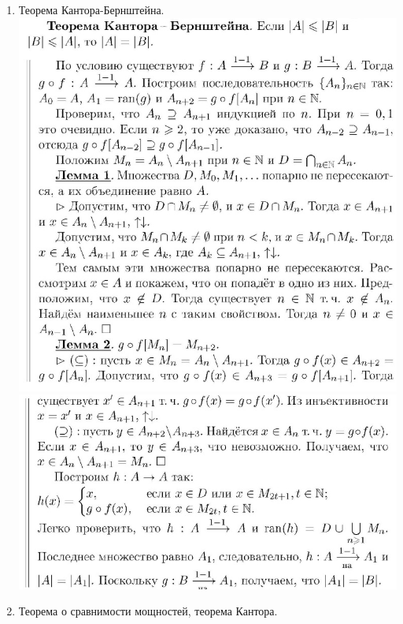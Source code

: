 \documentclass[a4paper]{article}
\theoremstyle{definition}
\begin{document}
\begin{enumerate}
 \item Теорема Кантора-Бернштейна.
       \mbox{}\\ \includegraphics[scale=0.7]{19_1.jpg}\\
       \includegraphics[scale=0.7]{19_2.jpg}
 \item Теорема о сравнимости мощностей, теорема Кантора.

\end{enumerate}
\end{document}
